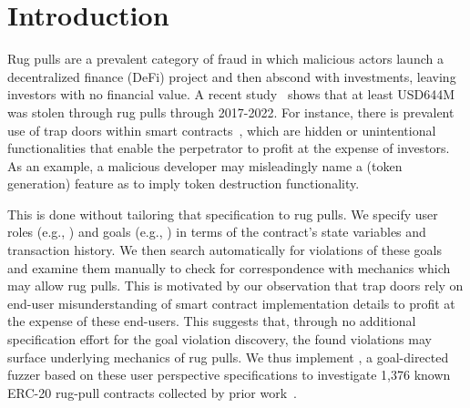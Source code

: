 \section{Introduction}
\label{sec-intro}

Rug pulls are a prevalent category of fraud in which malicious actors launch a decentralized finance (DeFi) project and then abscond with investments, leaving investors with no financial value.
A recent study~\cite{defi-crime-map_jcs25} shows that at least USD644M was stolen through rug pulls through 2017-2022.
For instance, there is prevalent use of trap doors within smart contracts~\cite{SoKRugPull2025}, which are hidden or unintentional functionalities that enable the perpetrator to profit at the expense of investors.
As an example, a malicious developer may misleadingly name a  (token generation) feature as  to imply token destruction functionality.

This is done without tailoring that specification to rug pulls.
We specify user roles (e.g., \holder) and goals (e.g., \maxowned) in terms of the contract's state variables and transaction history.
We then search automatically for violations of these goals and examine them manually to check for correspondence with mechanics which may allow rug pulls.
This is motivated by our observation that trap doors rely on end-user misunderstanding of smart contract implementation details to profit at the expense of these end-users.
This suggests that, through no additional specification effort for the goal violation discovery, the found violations may surface underlying mechanics of rug pulls.
We thus implement \spoilsport{}, a goal-directed fuzzer based on these user perspective specifications to investigate 1,376 known ERC-20 rug-pull contracts collected by prior work~\cite{SoKRugPull2025}.

